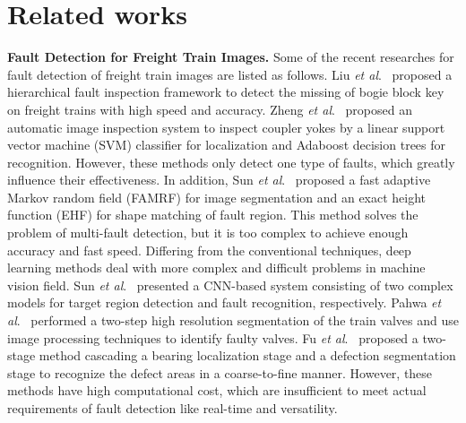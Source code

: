 \section{Related works}
\label{relatedworks}
\textbf{Fault Detection for Freight Train Images.}
Some of the recent researches for fault detection of freight train images are listed as follows. Liu \emph{et al}.~\cite{Liu2015Automated} proposed a hierarchical fault inspection framework to detect the missing of bogie block key on freight trains with high speed and accuracy. Zheng \emph{et al}.~\cite{Zheng2016Automatic} proposed an automatic image inspection system to inspect coupler yokes by a linear support vector machine (SVM) classifier for localization and Adaboost decision trees for recognition. However, these methods only detect one type of faults, which greatly influence their effectiveness. In addition, Sun \emph{et al}.~\cite{Sun2018Railway} proposed a fast adaptive Markov random field (FAMRF) for image segmentation and an exact height function (EHF) for shape matching of fault region. This method solves the problem of multi-fault detection, but it is too complex to achieve enough accuracy and fast speed. Differing from the conventional techniques, deep learning methods deal with more complex and difficult problems in machine vision field. Sun \emph{et al}.~\cite{Sun2017Automatic} presented a CNN-based system consisting of two complex models for target region detection and fault recognition, respectively. Pahwa \emph{et al}.~\cite{8917062} performed a two-step high resolution segmentation of the train valves and use image processing techniques to identify faulty valves. Fu \emph{et al}.~\cite{FU2020212} proposed a two-stage method cascading a bearing localization stage and a defection segmentation stage to recognize the defect areas in a coarse-to-fine manner. However, these methods have high computational cost, which are insufficient to meet actual requirements of fault detection like real-time and versatility.

